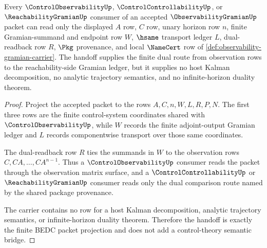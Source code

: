 \begin{theorem}
\label{thm:observability-gramian-dual-handoff}
Every $\ControlObservabilityUp$, $\ControlControllabilityUp$, or $\ReachabilityGramianUp$ consumer of an accepted $\ObservabilityGramianUp$ packet can read only the displayed $A$ row, $C$ row, unary horizon row $n$, finite Gramian-summand and endpoint row $W$, $\hsame$ transport ledger $L$, dual-readback row $R$, $\Pkg$ provenance, and local $\NameCert$ row of \autoref{def:observability-gramian-carrier}. The handoff supplies the finite dual route from observation rows to the reachability-side Gramian ledger, but it supplies no host Kalman decomposition, no analytic trajectory semantics, and no infinite-horizon duality theorem.
\end{theorem}
\begin{proof}
Project the accepted packet to the rows $A,C,n,W,L,R,P,N$. The first three rows are the finite control-system coordinates shared with $\ControlObservabilityUp$, while $W$ records the finite adjoint-output Gramian ledger and $L$ records componentwise transport over those same coordinates.

The dual-readback row $R$ ties the summands in $W$ to the observation rows $C,CA,\ldots,CA^{n-1}$. Thus a $\ControlObservabilityUp$ consumer reads the packet through the observation matrix surface, and a $\ControlControllabilityUp$ or $\ReachabilityGramianUp$ consumer reads only the dual comparison route named by the shared package provenance.

The carrier contains no row for a host Kalman decomposition, analytic trajectory semantics, or infinite-horizon duality theorem. Therefore the handoff is exactly the finite BEDC packet projection and does not add a control-theory semantic bridge.
\end{proof}

